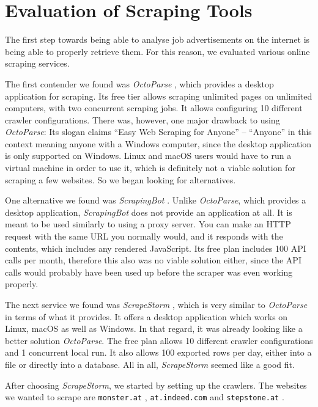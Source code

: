 \documentclass[runningheads]{llncs}
\begin{document}
\section{Evaluation of Scraping Tools}
\label{sec:evaluation_of_scraping_tools}

The first step towards being able to analyse job advertisements on the internet is being able to properly retrieve them. For this reason, we evaluated various online scraping services.

The first contender we found was \textit{OctoParse} \cite{octoparse}, which provides a desktop application for scraping. Its free tier allows scraping unlimited pages on unlimited computers, with two concurrent scraping jobs. It allows configuring 10 different crawler configurations. There was, however, one major drawback to using \textit{OctoParse}: Its slogan claims “Easy Web Scraping for Anyone” – “Anyone” in this context meaning anyone with a Windows computer, since the desktop application is only supported on Windows. Linux and macOS users would have to run a virtual machine in order to use it, which is definitely not a viable solution for scraping a few websites. So we began looking for alternatives.

One alternative we found was \textit{ScrapingBot} \cite{scrapingbot}. Unlike \textit{OctoParse}, which provides a desktop application, \textit{ScrapingBot} does not provide an application at all. It is meant to be used similarly to using a proxy server. You can make an HTTP request with the same URL you normally would, and it responds with the contents, which includes any rendered JavaScript. Its free plan includes 100 API calls per month, therefore this also was no viable solution either, since the API calls would probably have been used up before the scraper was even working properly.

The next service we found was \textit{ScrapeStorm} \cite{scrapestorm}, which is very similar to \textit{OctoParse} in terms of what it provides. It offers a desktop application which works on Linux, macOS as well as Windows. In that regard, it was already looking like a better solution \textit{OctoParse}. The free plan allows 10 different crawler configurations and 1 concurrent local run. It also allows 100 exported rows per day, either into a file or directly into a database. All in all, \textit{ScrapeStorm} seemed like a good fit.

After choosing \textit{ScrapeStorm}, we started by setting up the crawlers. The websites we wanted to scrape are \texttt{monster.at} \cite{monster}, \texttt{at.indeed.com} \cite{indeed} and \texttt{stepstone.at} \cite{stepstone}.
\end{document}

